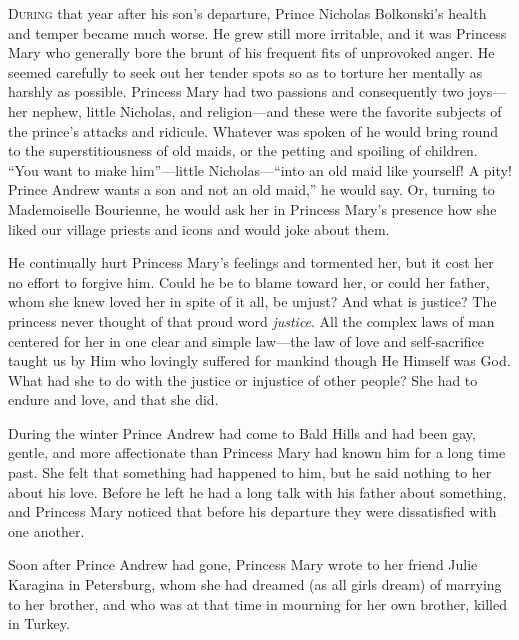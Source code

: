 \lettrine[lines=2, loversize=0.3, lraise=0]{\initfamily D}{uring}
that year after his son's departure, Prince Nicholas
Bolkonski's health and temper became much worse. He grew still
more irritable, and it was Princess Mary who generally bore the
brunt of his frequent fits of unprovoked anger. He seemed
carefully to seek out her tender spots so as to torture her
mentally as harshly as possible. Princess Mary had two passions
and consequently two joys---her nephew, little Nicholas, and
religion---and these were the favorite subjects of the prince's
attacks and ridicule. Whatever was spoken of he would bring round
to the superstitiousness of old maids, or the petting and
spoiling of children.  ``You want to make him''---little
Nicholas---``into an old maid like yourself! A pity! Prince
Andrew wants a son and not an old maid,'' he would say. Or,
turning to Mademoiselle Bourienne, he would ask her in Princess
Mary's presence how she liked our village priests and icons and
would joke about them.

He continually hurt Princess Mary's feelings and tormented her,
but it cost her no effort to forgive him. Could he be to blame
toward her, or could her father, whom she knew loved her in spite
of it all, be unjust?  And what is justice? The princess never
thought of that proud word \emph{justice}. All the complex laws of
man centered for her in one clear and simple law---the law of
love and self-sacrifice taught us by Him who lovingly suffered
for mankind though He Himself was God. What had she to do with
the justice or injustice of other people? She had to endure and
love, and that she did.

During the winter Prince Andrew had come to Bald Hills and had
been gay, gentle, and more affectionate than Princess Mary had
known him for a long time past. She felt that something had
happened to him, but he said nothing to her about his
love. Before he left he had a long talk with his father about
something, and Princess Mary noticed that before his departure
they were dissatisfied with one another.

Soon after Prince Andrew had gone, Princess Mary wrote to her
friend Julie Karagina in Petersburg, whom she had dreamed (as all
girls dream) of marrying to her brother, and who was at that time
in mourning for her own brother, killed in Turkey.

